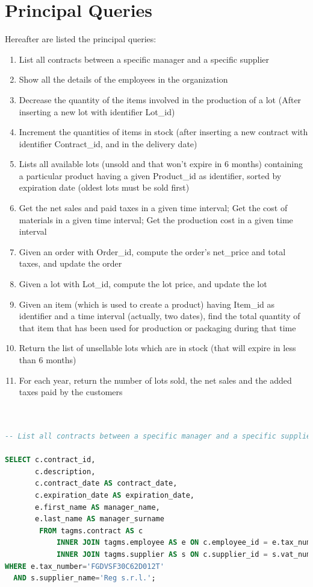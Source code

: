 \section{Principal Queries}
Hereafter are listed the principal queries:
\begin{enumerate}
    \item List all contracts between a specific manager and a specific supplier
    \item Show all the details of the employees in the organization
    \item Decrease the quantity of the items involved in the production of a lot (After inserting a new lot with identifier Lot\_id)
    \item Increment the quantities of items in stock (after inserting a new contract with identifier Contract\_id, and in the delivery date)
    \item Lists all available lots (unsold and that won't expire in 6 months) containing a particular product having a given Product\_id as identifier, sorted by expiration date (oldest lots must be sold first)
    \item Get the net sales and paid taxes in a given time interval; Get the cost of materials in a given time interval; Get the production cost in a given time interval
    \item Given an order with Order\_id, compute the order's net\_price and total taxes, and update the order
    \item Given a lot with Lot\_id, compute the lot price, and update the lot
    \item Given an item (which is used to create a product) having Item\_id as identifier and a time interval (actually, two dates), find the total quantity of that item that has been used for production or packaging during that time
    \item Return the list of unsellable lots which are in stock (that will expire in less than 6 months)
    \item For each year, return the number of lots sold, the net sales and the added taxes paid by the customers
\end{enumerate}

\begin{lstlisting}[language=SQL,
keywordstyle=\color{blue},
stringstyle=\color{mauve},
showstringspaces=false,
breaklines=true,
basicstyle=\ttfamily\footnotesize]


-- List all contracts between a specific manager and a specific supplier.

SELECT c.contract_id,
       c.description,
       c.contract_date AS contract_date,
       c.expiration_date AS expiration_date,
       e.first_name AS manager_name,
       e.last_name AS manager_surname
		FROM tagms.contract AS c
		    INNER JOIN tagms.employee AS e ON c.employee_id = e.tax_number
		    INNER JOIN tagms.supplier AS s ON c.supplier_id = s.vat_number
WHERE e.tax_number='FGDVSF30C62D012T'
  AND s.supplier_name='Reg s.r.l.';
  
\end{lstlisting}

